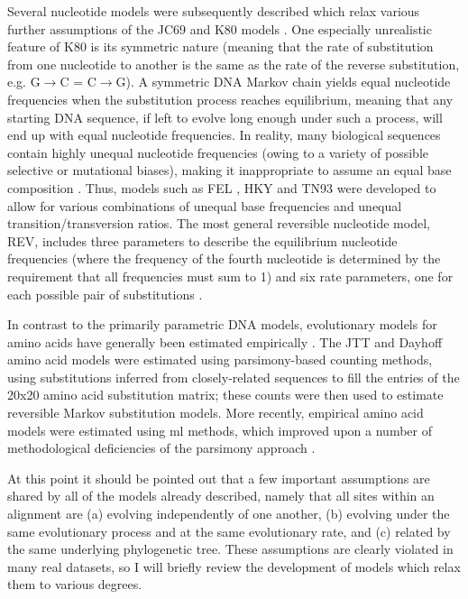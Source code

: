 Several nucleotide models were subsequently described which relax
various further assumptions of the JC69 and K80 models
\citep{Whelan2001,Yang2006}. One especially unrealistic feature of K80
is its symmetric nature (meaning that the rate of substitution from
one nucleotide to another is the same as the rate of the reverse
substitution, e.g. G$\to$C = C$\to$G). A symmetric DNA Markov chain
yields equal nucleotide frequencies when the substitution process
reaches equilibrium, meaning that any starting DNA sequence, if left
to evolve long enough under such a process, will end up with equal
nucleotide frequencies. In reality, many biological sequences contain
highly unequal nucleotide frequencies (owing to a variety of possible
selective or mutational biases), making it inappropriate to assume an
equal base composition \citep{Yang2006}. Thus, models such as FEL
\citep{Felsenstein1981a}, HKY \citep{Hasegawa1985} and TN93
\citep{Tamura1993} were developed to allow for various combinations of
unequal base frequencies and unequal transition/transversion
ratios. The most general reversible nucleotide model, REV, includes
three parameters to describe the equilibrium nucleotide frequencies
(where the frequency of the fourth nucleotide is determined by the
requirement that all frequencies must sum to 1) and six rate
parameters, one for each possible pair of substitutions
\citep{Tavare1986}.

In contrast to the primarily parametric DNA models, evolutionary
models for amino acids have generally been estimated empirically
\citep{Whelan2001}. The JTT \citep{Jones1992} and Dayhoff
\citep{Dayhoff1978} amino acid models were estimated using
parsimony-based counting methods, using substitutions inferred from
closely-related sequences to fill the entries of the 20x20 amino acid
substitution matrix; these counts were then used to estimate
reversible Markov substitution models. More recently, empirical amino
acid models were estimated using \ac{ml} methods, which improved upon
a number of methodological deficiencies of the parsimony approach
\citep{Adachi1996,Whelan2001b,Le2008}.

At this point it should be pointed out that a few important
assumptions are shared by all of the models already described, namely
that all sites within an alignment are (a) evolving independently of
one another, (b) evolving under the same evolutionary process and at
the same evolutionary rate, and (c) related by the same underlying
phylogenetic tree. These assumptions are clearly violated in many real
datasets, so I will briefly review the development of models which
relax them to various degrees.


